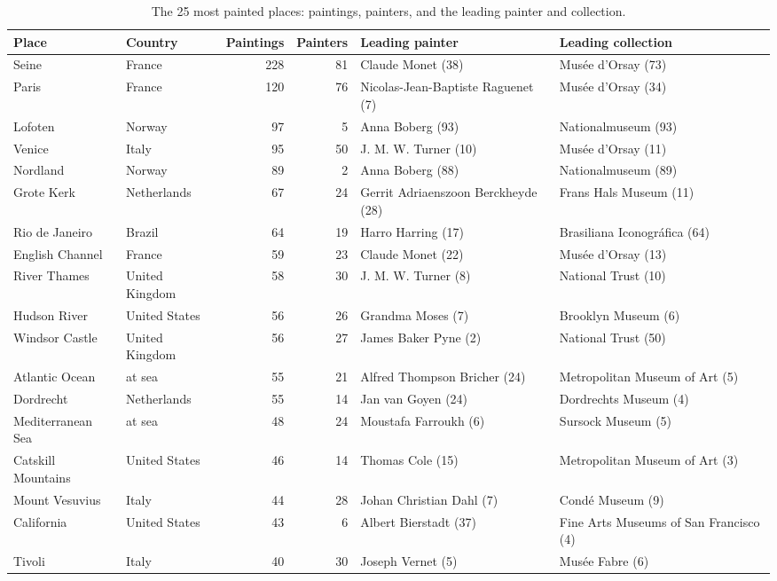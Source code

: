 \documentclass[11pt,a4paper]{article}
\begin{document}
\begin{table}[tbp]\centering\footnotesize\setlength{\tabcolsep}{4pt}\caption{The 25 most painted places: paintings, painters, and the leading painter and collection.}\label{tab:places}\begin{tabular}{p{2.9cm}p{2cm}rrp{3.5cm}p{3.6cm}}\toprule Place & Country & Paintings & Painters & Leading painter & Leading collection\\\midrule
Seine & France & 228 & 81 & Claude Monet (38) & Musée d'Orsay (73)\\
Paris & France & 120 & 76 & Nicolas-Jean-Baptiste Raguenet (7) & Musée d'Orsay (34)\\
Lofoten & Norway & 97 & 5 & Anna Boberg (93) & Nationalmuseum (93)\\
Venice & Italy & 95 & 50 & J. M. W. Turner (10) & Musée d'Orsay (11)\\
Nordland & Norway & 89 & 2 & Anna Boberg (88) & Nationalmuseum (89)\\
Grote Kerk & Netherlands & 67 & 24 & Gerrit Adriaenszoon Berckheyde (28) & Frans Hals Museum (11)\\
Rio de Janeiro & Brazil & 64 & 19 & Harro Harring (17) & Brasiliana Iconográfica (64)\\
English Channel & France & 59 & 23 & Claude Monet (22) & Musée d'Orsay (13)\\
River Thames & United Kingdom & 58 & 30 & J. M. W. Turner (8) & National Trust (10)\\
Hudson River & United States & 56 & 26 & Grandma Moses (7) & Brooklyn Museum (6)\\
Windsor Castle & United Kingdom & 56 & 27 & James Baker Pyne (2) & National Trust (50)\\
Atlantic Ocean & at sea & 55 & 21 & Alfred Thompson Bricher (24) & Metropolitan Museum of Art (5)\\
Dordrecht & Netherlands & 55 & 14 & Jan van Goyen (24) & Dordrechts Museum (4)\\
Mediterranean Sea & at sea & 48 & 24 & Moustafa Farroukh (6) & Sursock Museum (5)\\
Catskill Mountains & United States & 46 & 14 & Thomas Cole (15) & Metropolitan Museum of Art (3)\\
Mount Vesuvius & Italy & 44 & 28 & Johan Christian Dahl (7) & Condé Museum (9)\\
California & United States & 43 & 6 & Albert Bierstadt (37) & Fine Arts Museums of San Francisco (4)\\
Tivoli & Italy & 40 & 30 & Joseph Vernet (5) & Musée Fabre (6)\\

\end{tabular}
\end{table}
\end{document}
